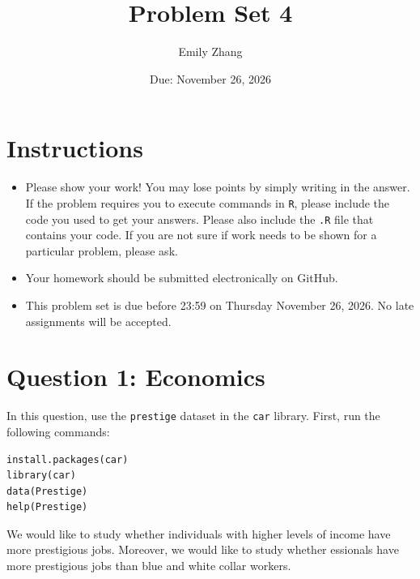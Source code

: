 \documentclass[12pt,letterpaper]{article}
\title{Problem Set 4}
\date{Due: November 26, 2026}
\author{Emily Zhang}
\begin{document}
	\maketitle
	\section*{Instructions}
	\begin{itemize}
		\item Please show your work! You may lose points by simply writing in the answer. If the problem requires you to execute commands in \texttt{R}, please include the code you used to get your answers. Please also include the \texttt{.R} file that contains your code. If you are not sure if work needs to be shown for a particular problem, please ask.
		\item Your homework should be submitted electronically on GitHub.
		\item This problem set is due before 23:59 on Thursday November 26, 2026. No late assignments will be accepted.
	\end{itemize}



	\vspace{.5cm}
\section*{Question 1: Economics}
\vspace{.25cm}
\noindent 	
In this question, use the \texttt{prestige} dataset in the \texttt{car} library. First, run the following commands:

\begin{verbatim}
install.packages(car)
library(car)
data(Prestige)
help(Prestige)
\end{verbatim} 


\noindent We would like to study whether individuals with higher levels of income have more prestigious jobs. Moreover, we would like to study whether essionals have more prestigious jobs than blue and white collar workers.
\end{document}
